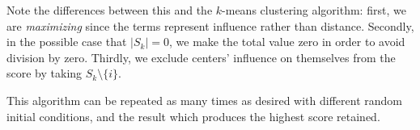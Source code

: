 %

Note the differences between this and the $k$-means clustering algorithm: first, we are \emph{maximizing} since the terms represent influence rather than distance. Secondly, in the possible case that $|S_k|=0$, we make the total value zero in order to avoid division by zero. Thirdly, we exclude centers' influence on themselves from the score by taking $S_k\setminus\{i\}$.

This algorithm can be repeated as many times as desired with different random initial conditions, and the result which produces the highest score retained.



